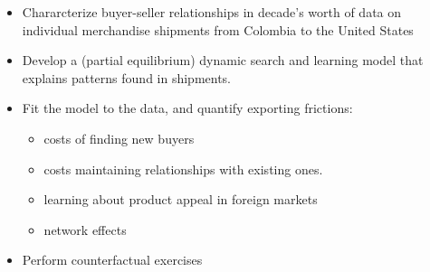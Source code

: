 \documentclass[notes=show]{beamer}
\begin{document}
\begin{frame}%


\begin{itemize}
\item Chararcterize buyer-seller relationships in decade's worth of data on
individual merchandise shipments from Colombia to the United States

\item Develop a (partial equilibrium) dynamic search and learning model that
explains patterns found in shipments.

\item Fit the model to the data, and quantify exporting frictions:

\begin{itemize}
\item costs of finding new buyers

\item costs maintaining relationships with existing ones.

\item learning about product appeal in foreign markets

\item network effects
\end{itemize}

\item Perform counterfactual exercises
\end{itemize}

\end{frame}%
\end{document}
